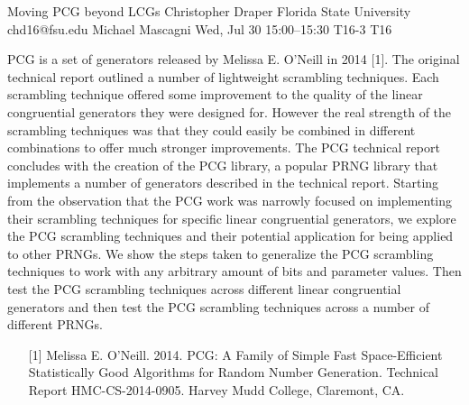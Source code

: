 \begin{talk}
  {Moving PCG beyond LCGs}%
  {Christopher Draper}%
  {Florida State University}%
  {chd16@fsu.edu}%
  {Michael Mascagni}%
  {}%
  {Wed, Jul 30 15:00–15:30}%
  {T16-3}%
  {T16}%
  
				
			
PCG is a set of generators released by Melissa E. O’Neill in 2014 [1]. The original technical report outlined a number of lightweight
scrambling techniques. Each scrambling technique offered some improvement to the quality of the linear congruential generators
they were designed for. However the real strength of the scrambling techniques was that they could easily be combined in different
combinations to offer much stronger improvements. The PCG technical report concludes with the creation of the PCG library, a
popular PRNG library that implements a number of generators described in the technical report. Starting from the observation that the
PCG work was narrowly focused on implementing their scrambling techniques for specific linear congruential generators, we explore
the PCG scrambling techniques and their potential application for being applied to other PRNGs. We show the steps taken to generalize the PCG
scrambling techniques to work with any arbitrary amount of bits and parameter values. Then test the PCG scrambling techniques
across different linear congruential generators and then test the PCG scrambling techniques across a number of different PRNGs.
\medskip

\begin{enumerate}
	\item[{[1]}] Melissa E. O’Neill. 2014. PCG: A Family of Simple Fast Space-Efficient Statistically Good Algorithms for Random Number Generation. Technical Report HMC-CS-2014-0905. Harvey Mudd College, Claremont, CA.
\end{enumerate}

\end{talk}

